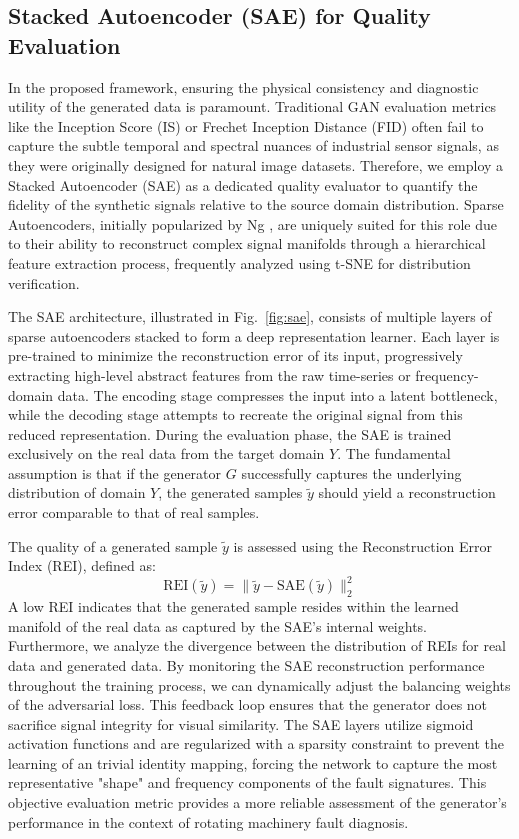 \documentclass[conference,twocolumn]{IEEEtran}
\begin{document}
\subsection{Stacked Autoencoder (SAE) for Quality Evaluation}
\label{sec:sae}

In the proposed framework, ensuring the physical consistency and diagnostic utility of the generated data is paramount. Traditional GAN evaluation metrics like the Inception Score (IS) or Frechet Inception Distance (FID) often fail to capture the subtle temporal and spectral nuances of industrial sensor signals, as they were originally designed for natural image datasets. Therefore, we employ a Stacked Autoencoder (SAE) as a dedicated quality evaluator to quantify the fidelity of the synthetic signals relative to the source domain distribution. Sparse Autoencoders, initially popularized by Ng \cite{Ng2011}, are uniquely suited for this role due to their ability to reconstruct complex signal manifolds through a hierarchical feature extraction process, frequently analyzed using t-SNE \cite{Maaten2008} for distribution verification.

The SAE architecture, illustrated in  Fig.~\ref{fig:sae}, consists of multiple layers of sparse autoencoders stacked to form a deep representation learner. Each layer is pre-trained to minimize the reconstruction error of its input, progressively extracting high-level abstract features from the raw time-series or frequency-domain data. The encoding stage compresses the input into a latent bottleneck, while the decoding stage attempts to recreate the original signal from this reduced representation. During the evaluation phase, the SAE is trained exclusively on the real data from the target domain $Y$. The fundamental assumption is that if the generator $G$ successfully captures the underlying distribution of domain $Y$, the generated samples $\tilde{y}$ should yield a reconstruction error comparable to that of real samples.

The quality of a generated sample $\tilde{y}$ is assessed using the Reconstruction Error Index (REI), defined as:
\begin{equation}
\text{REI}(\tilde{y}) = \| \tilde{y} - \text{SAE}(\tilde{y}) \|_2^2
\label{eq:rei}
\tag{9}
\end{equation}
A low REI indicates that the generated sample resides within the learned manifold of the real data as captured by the SAE's internal weights. Furthermore, we analyze the divergence between the distribution of REIs for real data and generated data. By monitoring the SAE reconstruction performance throughout the training process, we can dynamically adjust the balancing weights of the adversarial loss. This feedback loop ensures that the generator does not sacrifice signal integrity for visual similarity. The SAE layers utilize sigmoid activation functions and are regularized with a sparsity constraint to prevent the learning of an trivial identity mapping, forcing the network to capture the most representative "shape" and frequency components of the fault signatures. This objective evaluation metric provides a more reliable assessment of the generator's performance in the context of rotating machinery fault diagnosis.
\end{document}
